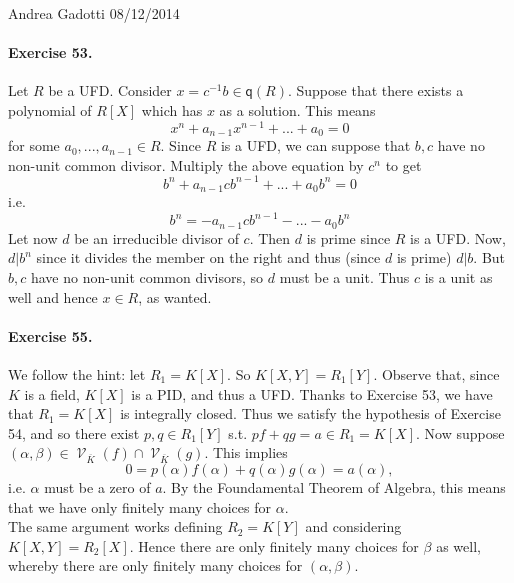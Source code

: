 \documentclass[12pt,a4paper]{report}
\theoremstyle{definition}
\theoremstyle{num.custom-title}
\DeclareMathOperator{\V}{\mathcal{V}}
\newcommand{\ol}{\overline}
\newcommand{\q}{\mathsf{q}}
\begin{document}
\noindent Andrea Gadotti \hfill 08/12/2014

\paragraph{Exercise 53.} Let $R$ be a UFD. Consider $x=c^{-1}b \in \q(R)$. Suppose that there exists a polynomial of $R[X]$ which has $x$ as a solution. This means
\[
x^n+a_{n-1}x^{n-1}+ ... +a_0=0
\]
for some $a_0,...,a_{n-1}\in R$. Since $R$ is a UFD, we can suppose that $b,c$ have no non-unit common divisor. Multiply the above equation by $c^n$ to get
\[
b^n+a_{n-1}cb^{n-1}+ ... +a_0b^n=0
\]
i.e.
\[
b^n= -a_{n-1}cb^{n-1}- ... -a_0b^n
\]
Let now $d$ be an irreducible divisor of $c$. Then $d$ is prime since $R$ is a UFD. Now, $d|b^n$ since it divides the member on the right and thus (since $d$ is prime) $d|b$. But $b, c$ have no non-unit common divisors, so $d$ must be a unit. Thus $c$ is a unit as well and hence $x \in R$, as wanted.

\paragraph{Exercise 55.} We follow the hint: let $R_1=K[X]$. So $K[X,Y]=R_1[Y]$. Observe that, since $K$ is a field, $K[X]$ is a PID, and thus a UFD. Thanks to Exercise 53, we have that $R_1=K[X]$ is integrally closed. 
Thus we satisfy the hypothesis of Exercise 54, and so there exist $p,q \in R_1[Y]$ s.t. $pf+qg=a \in R_1=K[X]$. Now suppose $(\alpha,\beta) \in \V_{\ol{K}}(f) \cap \V_{\ol{K}}(g)$. This implies
\[
0=p(\alpha)f(\alpha)+q(\alpha)g(\alpha)=a(\alpha),
\]
i.e. $\alpha$ must be a zero of $a$. By the Foundamental Theorem of Algebra, this means that we have only finitely many choices for $\alpha$.\\
The same argument works defining $R_2=K[Y]$ and considering $K[X,Y]=R_2[X]$. Hence there are only finitely many choices for $\beta$ as well, whereby there are only finitely many choices for $(\alpha,\beta)$.
\end{document}
